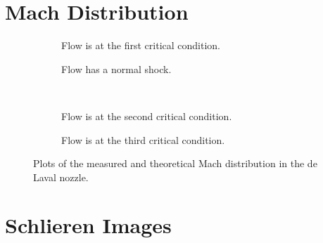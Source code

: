 \newpage

\section{Mach Distribution}

\begin{figure}[htpb]
    \centering
    \begin{subfigure}{0.49\textwidth}
        \centering
        
        \caption{Flow is at the first critical condition.}
        \label{fig:measured_vs_theoretical_mach_1st_critical}
    \end{subfigure}
    \begin{subfigure}{0.49\textwidth}
        \centering
        
        \caption{Flow has a normal shock.}
        \label{fig:measured_vs_theoretical_mach_normal_shock}
    \end{subfigure} \\
    \begin{subfigure}{0.49\textwidth}
        \centering
        
        \caption{Flow is at the second critical condition.}
        \label{fig:measured_vs_theoretical_mach_2nd_critical}
    \end{subfigure}
    \begin{subfigure}{0.49\textwidth}
        \centering
        
        \caption{Flow is at the third critical condition.}
        \label{fig:measured_vs_theoretical_mach_3rd_critical}
    \end{subfigure}
    \caption{Plots of the measured and theoretical Mach distribution in the de Laval nozzle.}
    \label{fig:measured_vs_theoretical_mach}
\end{figure}

\newpage

\section{Schlieren Images}

